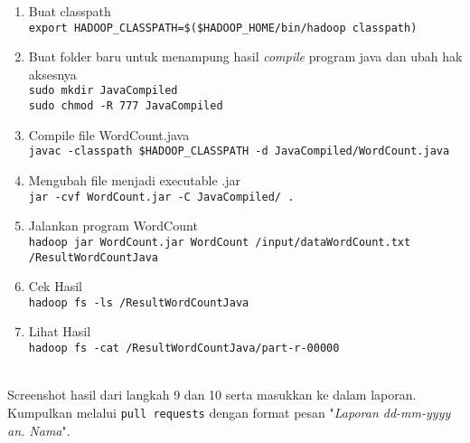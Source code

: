 \documentclass[a4paper]{tufte-handout}
\begin{document}
\begin{enumerate}
\item Buat classpath \\
{\tt export HADOOP\_CLASSPATH=\$(\$HADOOP\_HOME/bin/hadoop classpath)}

\item Buat folder baru untuk menampung hasil \textit{compile} program java dan ubah hak aksesnya \\
{\tt sudo mkdir JavaCompiled} \\
{\tt sudo chmod -R 777 JavaCompiled}

\item Compile file WordCount.java \\
{\tt \small{javac -classpath \$HADOOP\_CLASSPATH -d JavaCompiled/WordCount.java}}

\item Mengubah file menjadi executable .jar \\
{\tt jar -cvf WordCount.jar -C JavaCompiled/ .}

\item Jalankan program WordCount \\
{\tt \footnotesize{hadoop jar WordCount.jar WordCount /input/dataWordCount.txt /ResultWordCountJava}}

\item Cek Hasil \\
{\tt hadoop fs -ls /ResultWordCountJava}

\item Lihat Hasil \\
{\tt hadoop fs -cat /ResultWordCountJava/part-r-00000}
\end{enumerate}

 \\
Screenshot hasil dari langkah 9 dan 10 serta masukkan ke dalam laporan. Kumpulkan melalui {\tt pull requests} dengan format pesan "\textit{Laporan dd-mm-yyyy an. Nama}".

\hrulefill
\end{document}
